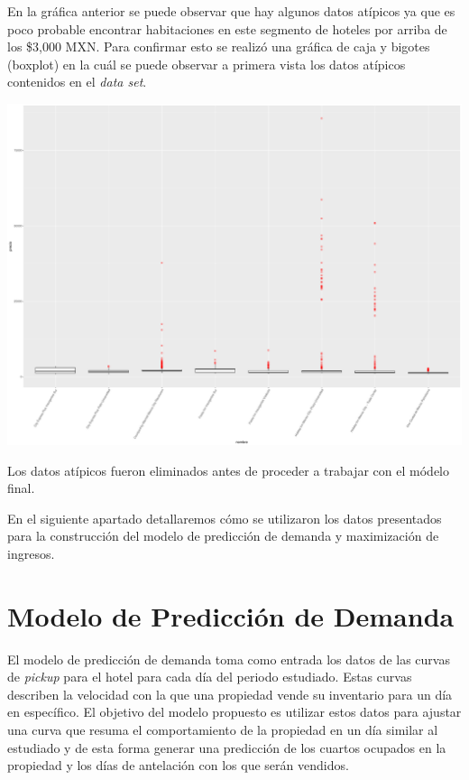 En la gráfica anterior se puede observar que hay algunos datos atípicos ya que es poco probable encontrar habitaciones en este segmento de hoteles por arriba de los \$3,000 MXN. Para confirmar esto se realizó una gráfica de caja y bigotes (boxplot) en la cuál se puede observar a primera vista los datos atípicos contenidos en el \emph{data set}.

\color{fgcolor}
\includegraphics[width=\maxwidth]{figures/PreciosBoxPlot-1} 

Los datos atípicos fueron eliminados antes de proceder a trabajar con el módelo final.


En el siguiente apartado detallaremos cómo se utilizaron los datos presentados para la construcción del modelo de predicción de demanda y maximización de ingresos.


\section*{Modelo de Predicción de Demanda}

El modelo de predicción de demanda toma como entrada los datos de las curvas de \emph{pickup} para el hotel para cada día del periodo estudiado. Estas curvas describen la velocidad con la que una propiedad vende su inventario para un día en específico. El objetivo del modelo propuesto es utilizar estos datos para ajustar una curva que resuma el comportamiento de la propiedad en un día similar al estudiado y de esta forma generar una predicción de los cuartos ocupados en la propiedad y los días de antelación con los que serán vendidos.

